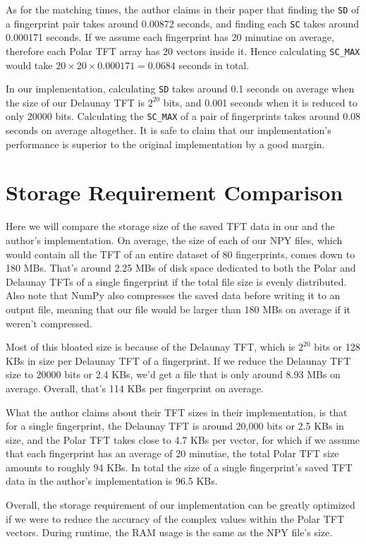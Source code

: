 \documentclass[fyp]{socreport}
\begin{document}
As for the matching times, the author claims in their paper that finding the \texttt{SD} of a fingerprint pair takes around 0.00872 seconds, and finding each \texttt{SC} takes around 0.000171 seconds. If we assume each fingerprint has 20 minutiae on average, therefore each Polar TFT array has 20 vectors inside it. Hence calculating \texttt{SC\_MAX} would take $20 \times 20 \times 0.000171 = 0.0684$ seconds in total.

In our implementation, calculating \texttt{SD} takes around 0.1 seconds on average when the size of our Delaunay TFT is $2^{20}$ bits, and 0.001 seconds when it is reduced to only 20000 bits. Calculating the \texttt{SC\_MAX} of a pair of fingerprints takes around 0.08 seconds on average altogether. It is safe to claim that our implementation's performance is superior to the original implementation by a good margin.

\section{Storage Requirement Comparison}
Here we will compare the storage size of the saved TFT data in our and the author's implementation. On average, the size of each of our NPY files, which would contain all the TFT of an entire dataset of 80 fingerprints, comes down to 180 MBs. That's around 2.25 MBs of disk space dedicated to both the Polar and Delaunay TFTs of a single fingerprint if the total file size is evenly distributed. Also note that NumPy also compresses the saved data before writing it to an output file, meaning that our file would be larger than 180 MBs on average if it weren't compressed. 

Most of this bloated size is because of the Delaunay TFT, which is $2^{20}$ bits or 128 KBs in size per Delaunay TFT of a fingerprint. If we reduce the Delaunay TFT size to 20000 bits or 2.4 KBs, we'd get a file that is only around 8.93 MBs on average. Overall, that's 114 KBs per fingerprint on average. 

What the author claims about their TFT sizes in their implementation, is that for a single fingerprint, the Delaunay TFT is around 20,000 bits or 2.5 KBs in size, and the Polar TFT takes close to 4.7 KBs per vector, for which if we assume that each fingerprint has an average of 20 minutiae, the total Polar TFT size amounts to roughly 94 KBs. In total the size of a single fingerprint's saved TFT data in the author's implementation is 96.5 KBs.

Overall, the storage requirement of our implementation can be greatly optimized if we were to reduce the accuracy of the complex values within the Polar TFT vectors. During runtime, the RAM usage is the same as the NPY file's size.
\end{document}
